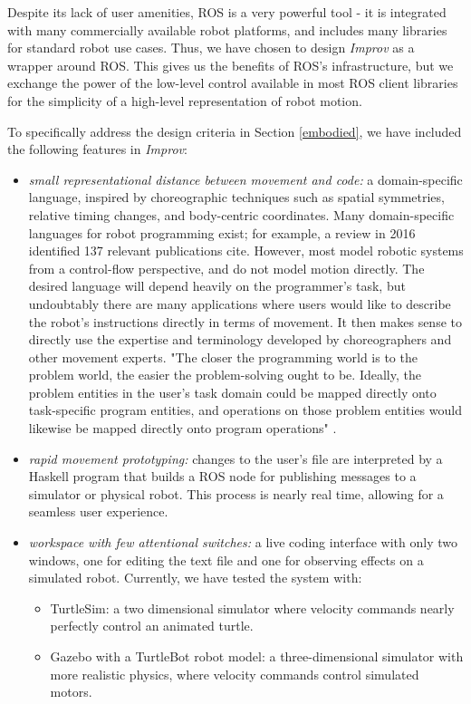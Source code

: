 \documentclass[sigconf]{acmart}
\begin{document}
Despite its lack of user amenities, ROS is a very powerful tool - it is
integrated with many commercially available robot platforms, and includes many
libraries for standard robot use cases. Thus, we have chosen to design
\emph{Improv} as a wrapper around ROS. This gives us the benefits of ROS's
infrastructure, but we exchange the power of the low-level control available in
most ROS client libraries for the simplicity of a high-level representation of
robot motion.

To specifically address the design criteria in Section \ref{embodied}, we have
included the following features in \emph{Improv}:

\begin{itemize}
\item \emph{small representational distance between
movement and code:} a domain-specific language, inspired by choreographic
techniques such as spatial symmetries, relative timing changes, and body-centric
coordinates. Many domain-specific languages for robot programming exist; for example, a
review in 2016 identified 137 relevant publications {\color{red} cite}. However, most model robotic
systems from a control-flow perspective, and do not model motion directly. The
desired language will depend heavily on the programmer's task, but undoubtably
there are many applications where users would like to describe the robot's
instructions directly in terms of movement. It then makes sense to directly use
the expertise and terminology developed by choreographers and other movement
experts. "The closer the programming world is to the problem world, the easier the
problem-solving ought to be. Ideally, the problem entities in the user's task
domain could be mapped directly onto task-specific program entities, and
operations on those problem entities would likewise be mapped directly onto
program operations" \cite{green1996usability}.
\item 
\emph{rapid movement prototyping:} changes to the user's file are interpreted by a 
Haskell program that builds a ROS node for publishing messages to a
simulator or physical robot. This process is nearly real time, allowing for a
seamless user experience.
\item \emph{workspace with few attentional switches:}
a live coding interface with only two windows, one for editing the text file and
one for observing effects on a simulated robot. Currently, we have tested the
system with:
\begin{itemize}
  \item
    TurtleSim: a two dimensional simulator where
    velocity commands nearly perfectly control an animated turtle.
  \item
    Gazebo with a TurtleBot robot model: a three-dimensional simulator
    with more realistic physics, where velocity commands control
    simulated motors.
  \end{itemize}
\end{itemize}
\end{document}
